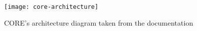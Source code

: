 \begin{figure}
  \centering
  \texttt{[image: core-architecture]}
  \caption{CORE's architecture diagram taken from the documentation}
  \label{fig:core-architecture}
\end{figure}
